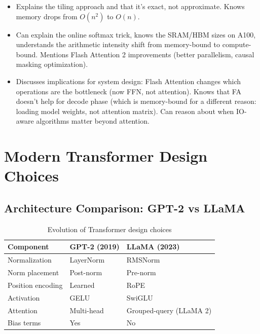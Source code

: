 \begin{interviewq}
\goodgreat
\begin{itemize}
    \item {} Explains the tiling approach and that it's exact, not approximate. Knows memory drops from $O(n^2)$ to $O(n)$.
    \item {} Can explain the online softmax trick, knows the SRAM/HBM sizes on A100, understands the arithmetic intensity shift from memory-bound to compute-bound. Mentions Flash Attention 2 improvements (better parallelism, causal masking optimization).
    \item {} Discusses implications for system design: Flash Attention changes which operations are the bottleneck (now FFN, not attention). Knows that FA doesn't help for decode phase (which is memory-bound for a different reason: loading model weights, not attention matrix). Can reason about when IO-aware algorithms matter beyond attention.
\end{itemize}

\end{interviewq}

\section{Modern Transformer Design Choices}
\label{sec:modern_design}

\subsection{Architecture Comparison: GPT-2 vs LLaMA}

\begin{table}[H]
\centering
\caption{Evolution of Transformer design choices}
\begin{tabularx}{\textwidth}{lXX}
\toprule
\textbf{Component} & \textbf{GPT-2 (2019)} & \textbf{LLaMA (2023)} \\
\midrule
Normalization & LayerNorm & RMSNorm \\
Norm placement & Post-norm & Pre-norm \\
Position encoding & Learned & RoPE \\
Activation & GELU & SwiGLU \\
Attention & Multi-head & Grouped-query (LLaMA 2) \\
Bias terms & Yes & No \\
\bottomrule
\end{tabularx}
\end{table}


